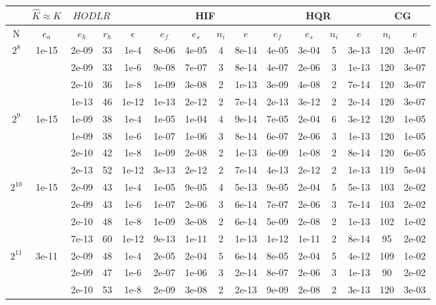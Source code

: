 \documentclass[11pt]{article}
\begin{document}
\begin{table}[!htbp]
\centering
\begin{tabular}{|c|c|c|c|c|c|c|c|c|c|c|c|c|c|c|}
\hline
\multicolumn{1}{c|}{} & \multicolumn{1}{c|}{$\hat{K} \approx K$} & \multicolumn{2}{c|}{$HODLR$} & \multicolumn{1}{c|}{} &\multicolumn{4}{c|}{HIF} & \multicolumn{4}{c|}{HQR} & \multicolumn{2}{c|}{CG} \\
\hline
N & $e_{a}$ & $e_{h}$ & $r_{h}$ & $\epsilon$ & $e_{f}$ & $e_{s}$ & $n_{i}$ & $e$ & $e_{f}$  & $e_{s}$ & $n_{i}$ & $e$ &  $n_{i}$ & $e$ \\ 
\hline
$2^{8}$ & 1e-15 & 2e-09 & 33 & 1e-4 & 8e-06 & 4e-05 & 4 & 8e-14 & 4e-05 & 3e-04 & 5 & 3e-13 & 120 & 3e-07\\
~ & ~ & 2e-09 & 33 & 1e-6 & 9e-08 & 7e-07 & 3 & 8e-14 & 4e-07 & 2e-06 & 3 & 1e-13 & 120 & 3e-07\\
~ & ~ & 2e-10 & 36 & 1e-8 & 1e-09 & 3e-08 & 2 & 1e-13 & 3e-09 & 4e-08 & 2 & 7e-14 & 120 & 3e-07\\
~ & ~ & 1e-13 & 46 & 1e-12 & 1e-13 & 2e-12 & 2 & 7e-14 & 2e-13 & 3e-12 & 2 & 2e-14 & 120 & 3e-07\\
\hline
$2^{9}$ & 1e-15 & 1e-09 & 38 & 1e-4 & 1e-05 & 1e-04 & 4 & 9e-14 & 7e-05 & 2e-04 & 6 & 3e-12 & 120 & 1e-05\\
~ & ~ & 1e-09 & 38 & 1e-6 & 1e-07 & 1e-06 & 3 & 8e-14 & 6e-07 & 2e-06 & 3 & 1e-13 & 120 & 1e-05\\
~ & ~ & 2e-10 & 42 & 1e-8 & 1e-09 & 2e-08 & 2 & 1e-13 & 6e-09 & 1e-08 & 2 & 8e-14 & 120 & 6e-05\\
~ & ~ & 2e-13 & 52 & 1e-12 & 3e-13 & 2e-12 & 2 & 7e-14 & 4e-13 & 2e-12 & 2 & 1e-13 & 119 & 5e-04\\
\hline
$2^{10}$ & 1e-15 & 2e-09 & 43 & 1e-4 & 1e-05 & 9e-05 & 4 & 5e-13 & 9e-05 & 2e-04 & 5 & 5e-13 & 103 & 2e-02\\
~ & ~ & 2e-09 & 43 & 1e-6 & 1e-07 & 2e-06 & 3 & 6e-14 & 7e-07 & 2e-06 & 3 & 7e-14 & 103 & 2e-02\\
~ & ~ & 2e-10 & 48 & 1e-8 & 1e-09 & 3e-08 & 2 & 6e-14 & 5e-09 & 2e-08 & 2 & 1e-13 & 102 & 1e-02\\
~ & ~ & 7e-13 & 60 & 1e-12 & 9e-13 & 1e-11 & 2 & 1e-13 & 1e-12 & 1e-11 & 2 & 8e-14 & 95 & 2e-02\\
\hline
$2^{11}$ & 3e-11 & 2e-09 & 48 & 1e-4 & 2e-05 & 2e-04 & 5 & 6e-14 & 8e-05 & 2e-04 & 5 & 4e-12 & 109 & 1e-02\\
~ & ~ & 2e-09 & 47 & 1e-6 & 2e-07 & 1e-06 & 3 & 2e-14 & 8e-07 & 2e-06 & 3 & 1e-13 & 90 & 2e-02\\
~ & ~ & 2e-10 & 53 & 1e-8 & 2e-09 & 3e-08 & 2 & 2e-13 & 9e-09 & 2e-08 & 2 & 3e-13 & 120 & 3e-03\\

\end{tabular}
\end{table}
\end{document}
